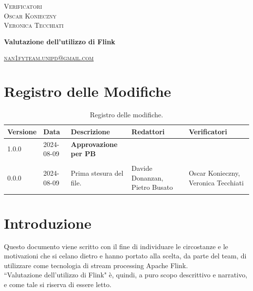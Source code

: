 \documentclass[8pt]{article}
\begin{document}
\begin{titlepage}
\begin{minipage}[t]{0.47\textwidth}
{		}
		\vspace{8mm}
		
		{\large{\textsc{Verificatori}}
			\vspace{3mm}
			{\\\large{\textsc{Oscar Konieczny}\\}}  %
			{\large{\textsc{Veronica Tecchiati}}}
			
		}
		\vspace{4mm}\vspace{4mm}
	\end{minipage}
	\vspace{4cm}
	\begin{center}
		\begin{flushright}
			{\fontsize{30pt}{52pt}\selectfont \textbf{Valutazione dell'utilizzo di Flink\\}} %
		\end{flushright}
		\vspace{3cm}
	\end{center}
	\vspace{9.5cm}
	{\small \textsc{\href{mailto: nan1fyteam.unipd@gmail.com}{nan1fyteam.unipd@gmail.com}}}
\end{titlepage}
\pagestyle{mystyle}
\section*{Registro delle Modifiche}
\begin{table}[ht!]
\hypersetup{hidelinks}
	\centering
	\begin{tabular}{p{1.2cm} p{2cm} p{4cm} p{4cm} p{3cm}}
		\toprule
		\textbf{Versione} & \textbf{Data} & \textbf{Descrizione} & \textbf{Redattori} & \textbf{Verificatori} \\
		\midrule
            1.0.0 & 2024-08-09 & \textbf{Approvazione per PB} & & \\\\
            0.0.0 & 2024-08-09 & Prima stesura del file. & Davide Donanzan, Pietro Busato & Oscar Konieczny, Veronica Tecchiati \\
		\bottomrule
	\end{tabular}
	\caption{Registro delle modifiche.}\label{table:Registro delle modifiche}
\end{table}
\newpage
\tableofcontents
\clearpage
\newpage
\justifying
\section{Introduzione}
Questo documento viene scritto con il fine di individuare le circostanze e le motivazioni che si celano dietro e hanno portato alla scelta, da parte del team, di utilizzare come tecnologia di stream processing Apache Flink.\\
``Valutazione dell'utilizzo di Flink" è, quindi, a puro scopo descrittivo e narrativo, e come tale si riserva di essere letto.
\end{document}
